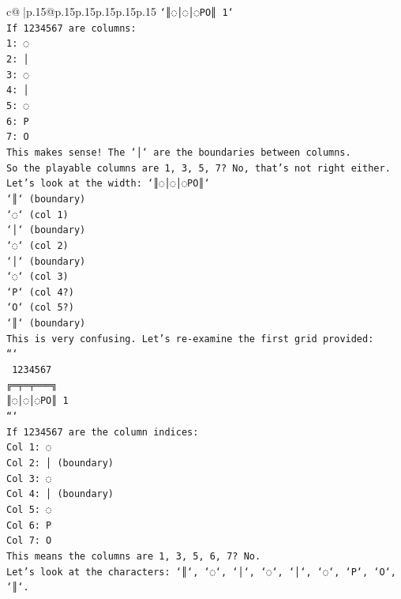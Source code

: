 \documentclass{article}
\begin{document}
{\begin{supertabular}{c@{$\;$}|p{.15\linewidth}@{}p{.15\linewidth}p{.15\linewidth}p{.15\linewidth}p{.15\linewidth}p{.15\linewidth}}
{{{\texttt{`║◌│◌│◌PO║ 1`} \\
\texttt{If 1234567 are columns:} \\
\texttt{1: ◌} \\
\texttt{2: │} \\
\texttt{3: ◌} \\
\texttt{4: │} \\
\texttt{5: ◌} \\
\texttt{6: P} \\
\texttt{7: O} \\
\texttt{This makes sense! The `│` are the boundaries between columns.} \\
\texttt{So the playable columns are 1, 3, 5, 7? No, that's not right either.} \\
\texttt{Let's look at the width: `║◌│◌│◌PO║`} \\
\texttt{`║` (boundary)} \\
\texttt{`◌` (col 1)} \\
\texttt{`│` (boundary)} \\
\texttt{`◌` (col 2)} \\
\texttt{`│` (boundary)} \\
\texttt{`◌` (col 3)} \\
\texttt{`P` (col 4?)} \\
\texttt{`O` (col 5?)} \\
\texttt{`║` (boundary)} \\
\texttt{This is very confusing. Let's re{-}examine the first grid provided:} \\
\texttt{```} \\
\texttt{ 1234567} \\
\texttt{╔═╤═╤═══╗} \\
\texttt{║◌│◌│◌PO║ 1} \\
\texttt{```} \\
\texttt{If 1234567 are the column indices:} \\
\texttt{Col 1: ◌} \\
\texttt{Col 2: │ (boundary)} \\
\texttt{Col 3: ◌} \\
\texttt{Col 4: │ (boundary)} \\
\texttt{Col 5: ◌} \\
\texttt{Col 6: P} \\
\texttt{Col 7: O} \\
\texttt{This means the columns are 1, 3, 5, 6, 7? No.} \\
\texttt{Let's look at the characters: `║`, `◌`, `│`, `◌`, `│`, `◌`, `P`, `O`, `║`.} \\
}}}
\end{supertabular}}
\end{document}
